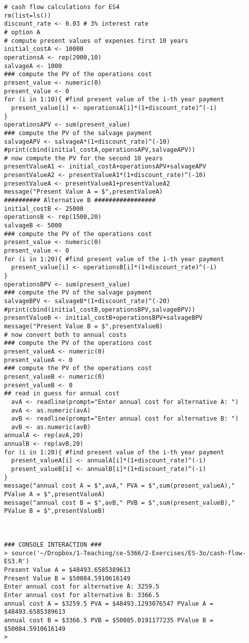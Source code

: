 \documentclass[12pt]{article}
\begin{document}
\begin{lstlisting}[caption=R code for Trial-Error to find equivalent annual cost, label=lst:AnnualCosts]
# cash flow calculations for ES4
rm(list=ls())
discount_rate <- 0.03 # 3% interest rate
# option A
# compute present values of expenses first 10 years
initial_costA <- 10000
operationsA <- rep(2000,10)
salvageA <- 1000
### compute the PV of the operations cost
present_value <- numeric(0)
present_value <- 0
for (i in 1:10){ #find present value of the i-th year payment
  present_value[i] <- operationsA[i]*(1+discount_rate)^(-i)
}
operationsAPV <- sum(present_value)
### compute the PV of the salvage payment
salvageAPV <- salvageA*(1+discount_rate)^(-10)
#print(cbind(initial_costA,operationsAPV,salvageAPV))
# now compute the PV for the second 10 years
presentValueA1 <- initial_costA+operationsAPV+salvageAPV
presentValueA2 <- presentValueA1*(1+discount_rate)^(-10)
presentValueA <- presentValueA1+presentValueA2
message("Present Value A = $",presentValueA)
########## Alternative B #################
initial_costB <- 25000
operationsB <- rep(1500,20)
salvageB <- 5000
### compute the PV of the operations cost
present_value <- numeric(0)
present_value <- 0
for (i in 1:20){ #find present value of the i-th year payment
  present_value[i] <- operationsB[i]*(1+discount_rate)^(-i)
}
operationsBPV <- sum(present_value)
### compute the PV of the salvage payment
salvageBPV <- salvageB*(1+discount_rate)^(-20)
#print(cbind(initial_costB,operationsBPV,salvageBPV))
presentValueB <- initial_costB+operationsBPV+salvageBPV
message("Present Value B = $",presentValueB)
# now convert both to annual costs
### compute the PV of the operations cost
present_valueA <- numeric(0)
present_valueA <- 0
### compute the PV of the operations cost
present_valueB <- numeric(0)
present_valueB <- 0
## read in guess for annual cost
  avA <- readline(prompt="Enter annual cost for alternative A: ")
  avA <- as.numeric(avA)
  avB <- readline(prompt="Enter annual cost for alternative B: ")
  avB <- as.numeric(avB)
annualA <- rep(avA,20)
annualB <- rep(avB,20)
for (i in 1:20){ #find present value of the i-th year payment
  present_valueA[i] <- annualA[i]*(1+discount_rate)^(-i)
  present_valueB[i] <- annualB[i]*(1+discount_rate)^(-i)
}
message("annual cost A = $",avA," PVA = $",sum(present_valueA)," PValue A = $",presentValueA)
message("annual cost B = $",avB," PVB = $",sum(present_valueB)," PValue B = $",presentValueB)



### CONSOLE INTERACTION ###
> source('~/Dropbox/1-Teaching/ce-5366/2-Exercises/ES-3o/cash-flow-ES3.R')
Present Value A = $48493.6585389613
Present Value B = $50084.5910616149
Enter annual cost for alternative A: 3259.5
Enter annual cost for alternative B: 3366.5
annual cost A = $3259.5 PVA = $48493.1293076547 PValue A = $48493.6585389613
annual cost B = $3366.5 PVB = $50085.0191177235 PValue B = $50084.5910616149
> \end{lstlisting}  
\end{document}
